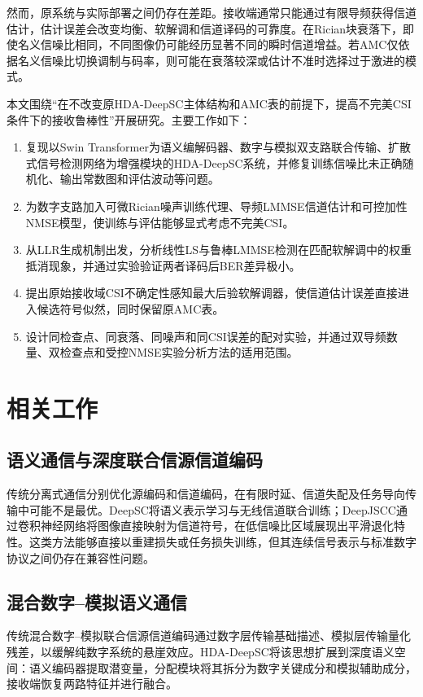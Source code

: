 \documentclass[UTF8,a4paper,11pt]{ctexart}
\newcommand{\HDADeepSC}{HDA-DeepSC}
\newcommand{\CSI}{CSI}
\newcommand{\AMC}{AMC}
\newcommand{\BER}{BER}
\newcommand{\NMSE}{NMSE}
\newcommand{\LLR}{LLR}
\begin{document}
然而，原系统与实际部署之间仍存在差距。接收端通常只能通过有限导频获得信道估计，估计误差会改变均衡、软解调和信道译码的可靠度。在Rician块衰落下，即使名义信噪比相同，不同图像仍可能经历显著不同的瞬时信道增益。若\AMC{}仅依据名义信噪比切换调制与码率，则可能在衰落较深或估计不准时选择过于激进的模式。

本文围绕“在不改变原\HDADeepSC{}主体结构和\AMC{}表的前提下，提高不完美\CSI{}条件下的接收鲁棒性”开展研究。主要工作如下：
\begin{enumerate}[label=\arabic*)]
  \item 复现以Swin Transformer\cite{liu2021swin}为语义编解码器、数字与模拟双支路联合传输、扩散式信号检测网络为增强模块的\HDADeepSC{}系统，并修复训练信噪比未正确随机化、输出常数图和评估波动等问题。
  \item 为数字支路加入可微Rician噪声训练代理、导频LMMSE信道估计和可控加性\NMSE{}模型，使训练与评估能够显式考虑不完美\CSI{}。
  \item 从\LLR{}生成机制出发，分析线性LS与鲁棒LMMSE检测在匹配软解调中的权重抵消现象，并通过实验验证两者译码后\BER{}差异极小。
  \item 提出原始接收域\CSI{}不确定性感知最大后验软解调器，使信道估计误差直接进入候选符号似然，同时保留原\AMC{}表。
  \item 设计同检查点、同衰落、同噪声和同\CSI{}误差的配对实验，并通过双导频数量、双检查点和受控\NMSE{}实验分析方法的适用范围。
\end{enumerate}

\section{相关工作}
\subsection{语义通信与深度联合信源信道编码}
传统分离式通信分别优化源编码和信道编码，在有限时延、信道失配及任务导向传输中可能不是最优。DeepSC将语义表示学习与无线信道联合训练\cite{xie2021deepsc}；DeepJSCC通过卷积神经网络将图像直接映射为信道符号，在低信噪比区域展现出平滑退化特性\cite{bourtsoulatze2019deepjscc}。这类方法能够直接以重建损失或任务损失训练，但其连续信号表示与标准数字协议之间仍存在兼容性问题。

\subsection{混合数字--模拟语义通信}
传统混合数字--模拟联合信源信道编码通过数字层传输基础描述、模拟层传输量化残差，以缓解纯数字系统的悬崖效应。\HDADeepSC{}将该思想扩展到深度语义空间：语义编码器提取潜变量，分配模块将其拆分为数字关键成分和模拟辅助成分，接收端恢复两路特征并进行融合\cite{xie2025hda}。
\end{document}
